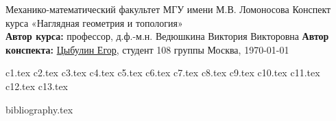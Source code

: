 \documentclass[a4paper, 12pt]{article}
\theoremstyle{plain}
\theoremstyle{definition}
\theoremstyle{remark}
\begin{document}
\begin{titlepage}
    \begin{center}
        \large Механико-математический факультет МГУ имени М.В. Ломоносова
        \vfill
        \Large Конспект курса «Наглядная геометрия и топология» \bigskip \\
        \large \textbf{Автор курса:} профессор, д.ф.-м.н. Ведюшкина Виктория Викторовна
        \textbf{Автор конспекта:} \href{https://github.com/betel-git}{Цыбулин Егор}, студент 108 группы
        \vfill
        Москва, \today
    \end{center}
\end{titlepage}
\tableofcontents
\newpage


{c1.tex}
{c2.tex}
\newpage
{c3.tex}
{c4.tex}
{c5.tex}
{c6.tex}
{c7.tex}
{c8.tex}
{c9.tex}
{c10.tex}
{c11.tex}
\newpage
{c12.tex}
{c13.tex}

\newpage
{bibliography.tex}
\end{document}
